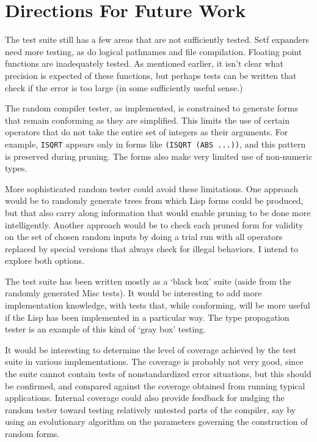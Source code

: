 \documentclass[11pt]{article}
\begin{document}
\section {Directions For Future Work}
\label{sec:future}

The test suite still has a few areas that are not sufficiently tested.
Setf expanders need more testing, as do logical pathnames and file
compilation.  Floating point functions are inadequately tested.  As
mentioned earlier, it isn't clear what precision is expected of these
functions, but perhaps tests can be written that check if the error
is too large (in some sufficiently useful sense.)

The random compiler tester, as implemented, is constrained to generate
forms that remain conforming as they are simplified.  This limits the
use of certain operators that do not take the entire set of integers
as their arguments.  For example, {\tt ISQRT} appears only in forms
like {\tt (ISQRT (ABS ...))}, and this pattern is preserved during
pruning.  The forms also make very limited use of non-numeric types.

More sophisticated random tester could avoid these limitations.  One
approach would be to randomly generate trees from which Lisp forms
could be produced, but that also carry along information that would
enable pruning to be done more intelligently.  Another approach would
be to check each pruned form for validity on the set of chosen random
inputs by doing a trial run with all operators replaced by special
versions that always check for illegal behaviors.  I intend to explore
both options.

The test suite has been written mostly as a `black box' suite (aside
from the randomly generated Misc tests).  It would be interesting to
add more implementation knowledge, with tests that, while conforming,
will be more useful if the Lisp has been implemented in a particular
way.  The type propagation tester is an example of this kind of `gray
box' testing.

It would be interesting to determine the level of coverage achieved by
the test suite in various implementations.  The coverage is probably
not very good, since the suite cannot contain tests of nonstandardized
error situations, but this should be confirmed, and compared against
the coverage obtained from running typical applications.  Internal
coverage could also provide feedback for nudging the random tester
toward testing relatively untested parts of the compiler, say by using
an evolutionary algorithm on the parameters governing the construction
of random forms.
\end{document}
